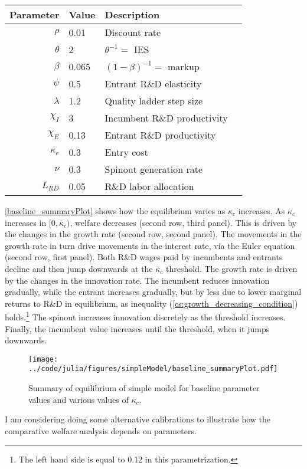 \documentclass[12pt,english]{article}
\theoremstyle{remark}
\begin{document}
\begin{table}[!htb]
	\centering
	\label{calibration_parameters}
	\begin{tabular}{rlll}
		\toprule \toprule
		Parameter & Value & Description \tabularnewline
		\midrule
		$\rho$ & 0.01 & Discount rate \tabularnewline
		$\theta$ & 2 & $\theta^{-1} = $ IES
		\tabularnewline
		$\beta$ & 0.065 & $(1-\beta)^{-1} = $ markup\tabularnewline
		$\psi$ & 0.5 & Entrant R\&D elasticity \tabularnewline
		$\lambda$ & 1.2 & Quality ladder step size
		\tabularnewline
		$\chi_I$ & 3 & Incumbent R\&D productivity
		\tabularnewline
		$\chi_E$ & 0.13 & Entrant R\&D productivity \tabularnewline
		$\kappa_e$ & 0.3 & Entry cost \tabularnewline
		$\nu$ & 0.3 & Spinout generation rate \tabularnewline
		$L_{RD}$ & 0.05 & R\&D labor allocation \tabularnewline
		\bottomrule
	\end{tabular}
\end{table}

\autoref{baseline_summaryPlot} shows how the equilibrium varies as $\kappa_c$ increases. As $\kappa_c$ increases in $[0,\bar{\kappa}_c)$, welfare decreases (second row, third panel). This is driven by the changes in the growth rate (second row, second panel). The movements in the growth rate in turn drive movements in the interest rate, via the Euler equation (second row, first panel). Both R\&D wages paid by incumbents and entrants decline and then jump downwards at the $\bar{\kappa}_c$ threshold. The growth rate is driven by the changes in the innovation rate. The incumbent reduces innovation gradually, while the entrant increases gradually, but by less due to lower marginal returns to R\&D in equilibrium, as inequality (\ref{cs:growth_decreasing_condition}) holds.\footnote{The left hand side is equal to 0.12 in this parametrization.} The spinout increases innovation discretely as the threshold increases. Finally, the incumbent value increases until the threshold, when it jumps downwards.

\begin{figure}[!htb]
\texttt{[image: ../code/julia/figures/simpleModel/baseline\_summaryPlot.pdf]}
\caption{Summary of equilibrium of simple model for baseline parameter values and various values of $\kappa_c$.}
\label{baseline_summaryPlot}
\end{figure}

I am considering doing some alternative calibrations to illustrate how the comparative welfare analysis depends on parameters.



\end{document}
